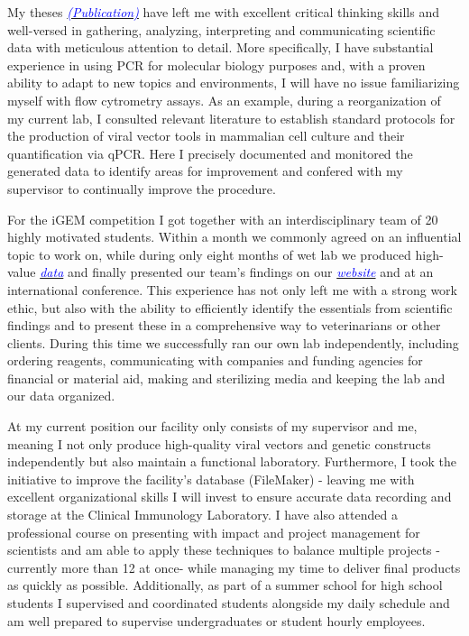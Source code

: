 \documentclass[11pt,a4paper,sans]{moderncv}
\begin{document}
\begin{spacing}{1.1}
My theses {\href{https://www.ncbi.nlm.nih.gov/pubmed/29517395}{\textcolor{blue}{{\textit{(Publication)}}}}} have left me with excellent critical thinking skills and well-versed in gathering, analyzing, interpreting and communicating scientific data with meticulous attention to detail. 
More specifically, I have substantial experience in using PCR for molecular biology purposes and, with a proven ability to adapt to new topics and environments, I will have no issue familiarizing myself with flow cytrometry assays. 
As an example, during a reorganization of my current lab, I consulted relevant literature to establish standard protocols for the production of viral vector tools in mammalian cell culture and their quantification via qPCR. 
Here I precisely documented and monitored the generated data to identify areas for improvement and confered with my supervisor to continually improve the procedure. \par%
For the iGEM competition I got together with an interdisciplinary team of 20 highly motivated students. 
Within a month we commonly agreed on an influential topic to work on, while during only eight months of wet lab we produced high-value  {\href{https://www.ncbi.nlm.nih.gov/pubmed/29803867}{\textcolor{blue}{\textit{data}}}} and finally presented our team's findings on our {\href{http://2015.igem.org/Team:Freiburg}{\textcolor{blue}{\textit{website}}}} and at an international conference. 
This experience has not only left me with a strong work ethic, but also with the ability to efficiently identify the essentials from scientific findings and to present these in a comprehensive way to veterinarians or other clients. 
During this time we successfully ran our own lab independently, including ordering reagents, communicating with companies and funding agencies for financial or material aid, making and sterilizing media and keeping the lab and our data organized. \par 
At my current position our facility only consists of my supervisor and me, meaning I not only produce high-quality viral vectors and genetic constructs independently but also maintain a functional laboratory. 
Furthermore, I took the initiative to improve the facility's database (FileMaker) - leaving me with excellent organizational skills I will invest to ensure accurate data recording and storage at the Clinical Immunology Laboratory. 
I have also attended a professional course on presenting with impact and project management for scientists and am able to apply these techniques to balance multiple projects - currently more than 12 at once- while managing my time to deliver final products as quickly as possible. 
Additionally, as part of a summer school for high school students I supervised and coordinated students alongside my daily schedule and am well prepared to supervise undergraduates or student hourly employees. \par%



\end{spacing}
\end{document}
